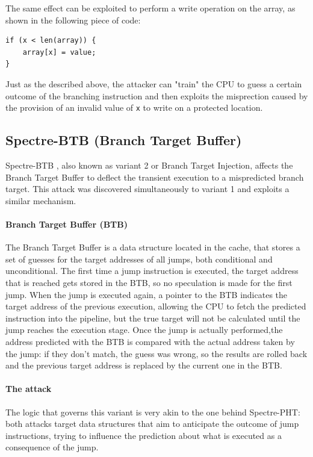\documentclass[12pt,a4paper]{book}
\theoremstyle{definition}
\begin{document}
	The same effect can be exploited to perform a write operation on the array, as shown in the following piece of code:
	\begin{lstlisting}
if (x < len(array)) { 
	array[x] = value; 
}
	\end{lstlisting}  
	Just as the described above, the attacker can "train" the CPU to guess a certain outcome of the branching instruction and then exploits the misprection caused by the provision of an invalid value of \texttt{x} to write on a protected location.
	\subsection{Spectre-BTB (Branch Target Buffer)}
	Spectre-BTB \cite{Kocher2019} \cite{Canella2019}, also known as variant 2 or Branch Target Injection, affects the Branch Target Buffer to deflect the transient execution to a mispredicted branch target. This attack was discovered simultaneously to variant 1 and exploits a similar mechanism.
	
	\paragraph{Branch Target Buffer (BTB)} The Branch Target Buffer \cite{Perleberg1989} is a data structure located in the cache, that stores a set of guesses for the target addresses of all jumps, both conditional and unconditional. The first time a jump instruction is executed, the target address that is reached gets stored in the BTB, so no speculation is made for the first jump. When the jump is executed again, a pointer to the BTB indicates the target address of the previous execution, allowing the CPU to fetch the  predicted instruction into the pipeline, but the true target will not be calculated until the jump reaches the execution stage. Once the jump is actually performed,the address predicted with the BTB is compared with the actual address taken by the jump: if they don't match, the guess was wrong, so the results are rolled back and the previous target address is replaced by the current one in the BTB.
	\paragraph{The attack} The logic that governs this variant is very akin to the one behind Spectre-PHT: both attacks target data structures that aim to anticipate the outcome of jump instructions, trying to influence the prediction about what is executed as a consequence of the jump.
	
\end{document}
